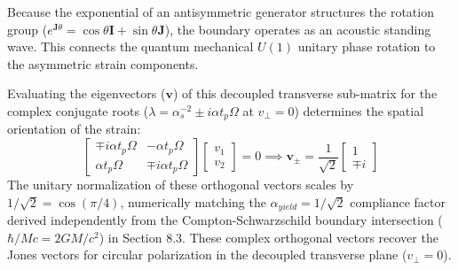 Because the exponential of an antisymmetric generator structures the rotation group ($e^{\mathbf{J}\theta} = \cos\theta \mathbf{I} + \sin\theta \mathbf{J}$), the boundary operates as an acoustic standing wave. This connects the quantum mechanical $U(1)$ unitary phase rotation to the asymmetric strain components. 

Evaluating the eigenvectors ($\mathbf{v}$) of this decoupled transverse sub-matrix for the complex conjugate roots ($\lambda = \alpha_s^{-2} \pm i \alpha t_p \Omega$ at $v_\perp = 0$) determines the spatial orientation of the strain: %
\begin{equation} 
    \begin{bmatrix} \mp i \alpha t_p \Omega & -\alpha t_p \Omega \\ \alpha t_p \Omega & \mp i \alpha t_p \Omega \end{bmatrix} \begin{bmatrix} v_1 \\ v_2 \end{bmatrix} = 0 \implies \mathbf{v}_\pm = \frac{1}{\sqrt{2}} \begin{bmatrix} 1 \\ \mp i \end{bmatrix} 
\end{equation} 
The unitary normalization of these orthogonal vectors scales by $1/\sqrt{2} = \cos(\pi/4)$, numerically matching the $\alpha_{yield} = 1/\sqrt{2}$ compliance factor derived independently from the Compton-Schwarzschild boundary intersection ($\hbar / Mc = 2GM/c^2$) in Section 8.3. These complex orthogonal vectors recover the Jones vectors for circular polarization in the decoupled transverse plane ($v_\perp = 0$). %

